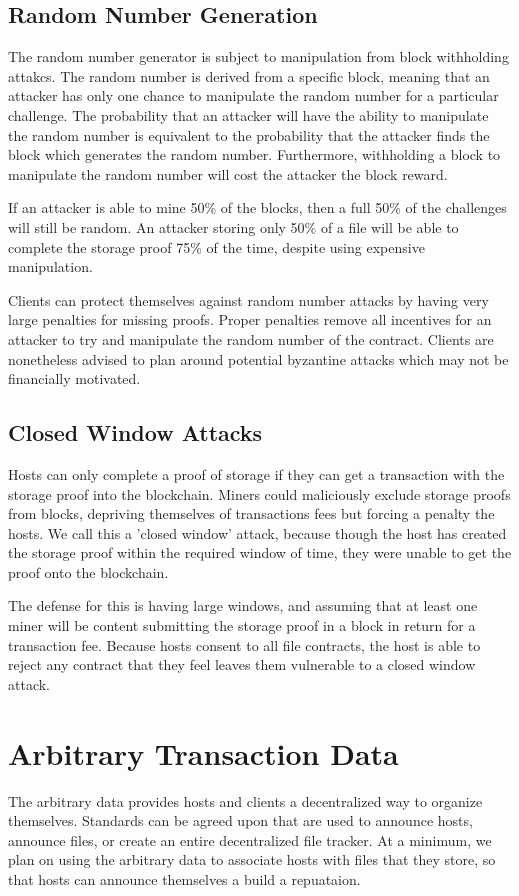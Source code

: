 \documentclass[twocolumn]{article}
\begin{document}
\subsection{Random Number Generation}
The random number generator is subject to manipulation from block withholding attakcs.
The random number is derived from a specific block, meaning that an attacker has only one chance to manipulate the random number for a particular challenge.
The probability that an attacker will have the ability to manipulate the random number is equivalent to the probability that the attacker finds the block which generates the random number.
Furthermore, withholding a block to manipulate the random number will cost the attacker the block reward.

If an attacker is able to mine 50\% of the blocks, then a full 50\% of the challenges will still be random.
An attacker storing only 50\% of a file will be able to complete the storage proof 75\% of the time, despite using expensive manipulation.

Clients can protect themselves against random number attacks by having very large penalties for missing proofs.
Proper penalties remove all incentives for an attacker to try and manipulate the random number of the contract.
Clients are nonetheless advised to plan around potential byzantine attacks which may not be financially motivated.

\subsection{Closed Window Attacks}
Hosts can only complete a proof of storage if they can get a transaction with the storage proof into the blockchain.
Miners could maliciously exclude storage proofs from blocks, depriving themselves of transactions fees but forcing a penalty the hosts.
We call this a 'closed window' attack, because though the host has created the storage proof within the required window of time, they were unable to get the proof onto the blockchain.

The defense for this is having large windows, and assuming that at least one miner will be content submitting the storage proof in a block in return for a transaction fee.
Because hosts consent to all file contracts, the host is able to reject any contract that they feel leaves them vulnerable to a closed window attack.

\section{Arbitrary Transaction Data}
The arbitrary data provides hosts and clients a decentralized way to organize themselves.
Standards can be agreed upon that are used to announce hosts, announce files, or create an entire decentralized file tracker.
At a minimum, we plan on using the arbitrary data to associate hosts with files that they store, so that hosts can announce themselves a build a repuataion.
\end{document}
